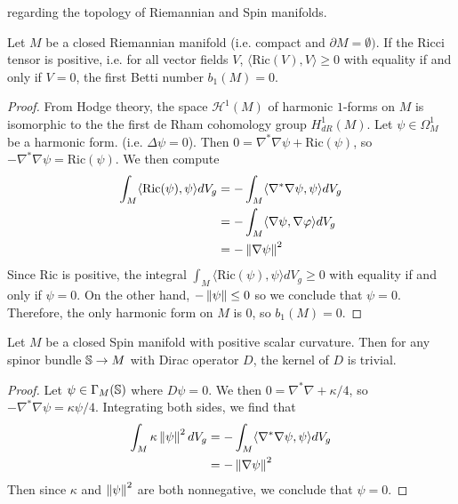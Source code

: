 regarding the topology of Riemannian and Spin manifolds.
%
\begin{thm}
Let $M$ be a closed Riemannian manifold (i.e. compact and $\partial M = \emptyset)$.
If the Ricci tensor is positive, i.e. for all vector fields $V$,
$\langle \mathrm{Ric}(V), V\rangle \geq 0$ with equality if and only if $V = 0$, the
first Betti number $b_1(M) = 0$.
\end{thm}
%
\begin{proof}
From Hodge theory, the space $\mathcal{H}^1(M)$ of harmonic $1$-forms on $M$ is
isomorphic to the the first de Rham cohomology group $H^1_{dR}(M)$. Let
$\psi \in \Omega^1_M$ be a harmonic form. (i.e. $\Delta\psi = 0$). Then
$0 = \nabla^*\nabla\psi + \mathrm{Ric}(\psi)$, so
$-\nabla^*\nabla\psi = \mathrm{Ric}(\psi)$. We then compute
\begin{align*}
\int_M \langle \mathrm{Ric}(\psi),\psi \rangle dV_g
&= -\int_M \langle \nabla^*\nabla\psi,\psi\rangle dV_g \\
&= -\int_M \langle \nabla\psi,\nabla\varphi\rangle dV_g \\
&= -\norm{\nabla\psi}^2
\end{align*}
Since $\mathrm{Ric}$ is positive, the integral
$\int_M \langle \mathrm{Ric}(\psi),\psi \rangle dV_g \geq 0$ with equality if and
only if $\psi = 0$. On the other hand, $-\norm{\psi} \leq 0$ so we conclude that
$\psi = 0$. Therefore, the only harmonic form on $M$ is $0$, so $b_1(M) = 0$.
\end{proof}
%
\begin{thm}
Let $M$ be a closed Spin manifold with positive scalar curvature. Then for any
spinor bundle $\S \to M$ with Dirac operator $D$, the kernel of $D$ is trivial.
\end{thm}
%
\begin{proof} %
Let $\psi \in \Gamma_M(\S)$ where $D\psi = 0$. We then $0 = \nabla^*\nabla + \kappa/4$,
so $-\nabla^*\nabla\psi = \kappa\psi/4$. Integrating both sides, we find that
\begin{align*}
\int_M \kappa\norm{\psi}^2 dV_g
&= -\int_M \langle \nabla^*\nabla\psi, \psi \rangle dV_g \\
&= -\norm{\nabla\psi}^2
\end{align*}
Then since $\kappa$ and $\norm{\psi}^2$ are both nonnegative, we conclude
that $\psi = 0$.
\end{proof}
%